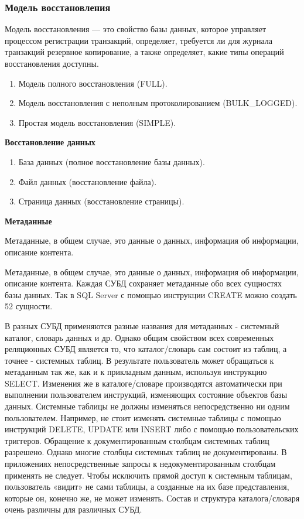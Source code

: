 \subsubsection{Модель восстановления}

Модель восстановления --- это свойство базы данных, которое управляет процессом регистрации транзакций, определяет, требуется ли для журнала транзакций резервное копирование, а также определяет, какие типы операций восстановления доступны.

\begin{enumerate}
	\item Модель полного восстановления (FULL).
	\item Модель восстановления с неполным протоколированием (BULK\_LOGGED).
	\item Простая модель восстановления (SIMPLE).
\end{enumerate}

\textbf{Восстановление данных}

\begin{enumerate}
	\item База данных (полное восстановление базы данных).
	\item Файл данных (восстановление файла).
	\item Страница данных (восстановление страницы).
\end{enumerate}

\textbf{Метаданные}

Метаданные, в общем случае, это данные о данных, информация об информации, описание контента.

Метаданные, в общем случае, это данные о данных, информация об
информации, описание контента. Каждая СУБД сохраняет метаданные обо
всех сущностях базы данных. Так в SQL Server с помощью инструкции
CREATE можно создать 52 сущности.

В разных СУБД применяются разные названия для метаданных -
системный каталог, словарь данных и др. Однако общим свойством всех
современных реляционных СУБД является то, что каталог/словарь сам
состоит из таблиц, а точнее - системных таблиц. В результате пользователь
может обращаться к метаданным так же, как и к прикладным данным,
используя инструкцию SELECT. Изменения же в каталоге/словаре
производятся автоматически при выполнении пользователем инструкций,
изменяющих состояние объектов базы данных. Системные таблицы не
должны изменяться непосредственно ни одним пользователем. Например,
не стоит изменять системные таблицы с помощью инструкций DELETE,
UPDATE или INSERT либо с помощью пользовательских триггеров.
Обращение к документированным столбцам системных таблиц разрешено.
Однако многие столбцы системных таблиц не документированы. В
приложениях непосредственные запросы к недокументированным
столбцам применять не следует. Чтобы исключить прямой доступ к
системным таблицам, пользователь «видит» не сами таблицы, а созданные
на их базе представления, которые он, конечно же, не может изменять.
Состав и структура каталога/словаря очень различны для различных СУБД.


